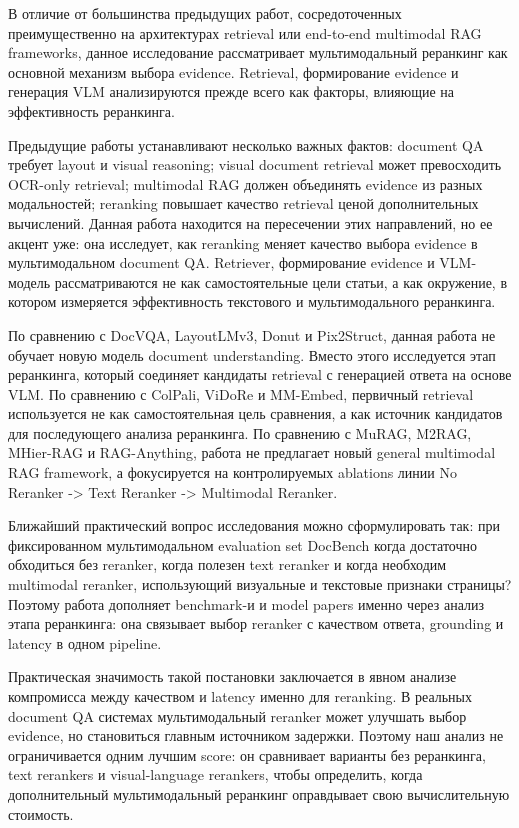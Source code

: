 \documentclass[conference]{IEEEtran}
\begin{document}
В отличие от большинства предыдущих работ, сосредоточенных преимущественно на архитектурах retrieval или end-to-end multimodal RAG frameworks, данное исследование рассматривает мультимодальный реранкинг как основной механизм выбора evidence. Retrieval, формирование evidence и генерация VLM анализируются прежде всего как факторы, влияющие на эффективность реранкинга.

Предыдущие работы устанавливают несколько важных фактов: document QA требует layout и visual reasoning; visual document retrieval может превосходить OCR-only retrieval; multimodal RAG должен объединять evidence из разных модальностей; reranking повышает качество retrieval ценой дополнительных вычислений. Данная работа находится на пересечении этих направлений, но ее акцент уже: она исследует, как reranking меняет качество выбора evidence в мультимодальном document QA. Retriever, формирование evidence и VLM-модель рассматриваются не как самостоятельные цели статьи, а как окружение, в котором измеряется эффективность текстового и мультимодального реранкинга.

По сравнению с DocVQA, LayoutLMv3, Donut и Pix2Struct, данная работа не обучает новую модель document understanding. Вместо этого исследуется этап реранкинга, который соединяет кандидаты retrieval с генерацией ответа на основе VLM. По сравнению с ColPali, ViDoRe и MM-Embed, первичный retrieval используется не как самостоятельная цель сравнения, а как источник кандидатов для последующего анализа реранкинга. По сравнению с MuRAG, M2RAG, MHier-RAG и RAG-Anything, работа не предлагает новый general multimodal RAG framework, а фокусируется на контролируемых ablations линии No Reranker -> Text Reranker -> Multimodal Reranker.

Ближайший практический вопрос исследования можно сформулировать так: при фиксированном мультимодальном evaluation set DocBench когда достаточно обходиться без reranker, когда полезен text reranker и когда необходим multimodal reranker, использующий визуальные и текстовые признаки страницы? Поэтому работа дополняет benchmark-и и model papers именно через анализ этапа реранкинга: она связывает выбор reranker с качеством ответа, grounding и latency в одном pipeline.

Практическая значимость такой постановки заключается в явном анализе компромисса между качеством и latency именно для reranking. В реальных document QA системах мультимодальный reranker может улучшать выбор evidence, но становиться главным источником задержки. Поэтому наш анализ не ограничивается одним лучшим score: он сравнивает варианты без реранкинга, text rerankers и visual-language rerankers, чтобы определить, когда дополнительный мультимодальный реранкинг оправдывает свою вычислительную стоимость.
\end{document}
